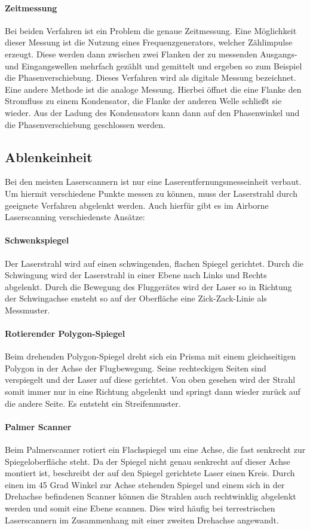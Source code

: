 \documentclass[a4paper,12pt,bibliography=totoc, listof=totoc,titlepage,pointlessnumbers]{scrreprt}
\begin{document}
\paragraph{Zeitmessung}
Bei beiden Verfahren ist ein Problem die genaue Zeitmessung. Eine Möglichkeit dieser Messung ist die Nutzung eines Frequenzgenerators, welcher Zählimpulse erzeugt. Diese werden dann zwischen zwei Flanken der zu messenden Ausgangs- und Eingangswellen mehrfach gezählt und gemittelt und ergeben so zum Beispiel die Phasenverschiebung. Dieses Verfahren wird als digitale Messung bezeichnet. Eine andere Methode ist die analoge Messung. Hierbei öffnet die eine Flanke den Stromfluss zu einem Kondensator, die Flanke der anderen Welle schließt sie wieder. Aus der Ladung des Kondensators kann dann auf den Phasenwinkel und die Phasenverschiebung geschlossen werden.  \citep[S. 314f]{Witte2006}

\subsection{Ablenkeinheit}
Bei den meisten Laserscannern ist nur eine Laserentfernungsmesseinheit verbaut. Um hiermit verschiedene Punkte messen zu können, muss der Laserstrahl durch geeignete Verfahren abgelenkt werden. Auch hierfür gibt es im Airborne Laserscanning verschiedenste Ansätze:

\paragraph{Schwenkspiegel}
Der Laserstrahl wird auf einen schwingenden, flachen Spiegel gerichtet. Durch die Schwingung wird der Laserstrahl in einer Ebene nach Links und Rechts abgelenkt. Durch die Bewegung des Fluggerätes wird der Laser so in Richtung der Schwingachse ensteht so auf der Oberfläche eine Zick-Zack-Linie als Messmuster.

\paragraph{Rotierender Polygon-Spiegel}
Beim drehenden Polygon-Spiegel dreht sich ein Prisma mit einem gleichseitigen Polygon in der Achse der Flugbewegung. Seine rechteckigen Seiten sind verspiegelt und der Laser auf diese gerichtet. Von oben gesehen wird der Strahl somit immer nur in eine Richtung abgelenkt und springt dann wieder zurück auf die andere Seite. Es entsteht ein Streifenmuster.

\paragraph{Palmer Scanner}
Beim Palmerscanner rotiert ein Flachspiegel um eine Achse, die fast senkrecht zur Spiegeloberfläche steht. Da der Spiegel nicht genau senkrecht auf dieser Achse montiert ist, beschreibt der auf den Spiegel gerichtete Laser einen Kreis. Durch einen im 45 Grad Winkel zur Achse stehenden Spiegel und einem sich in der Drehachse befindenen Scanner können die Strahlen auch rechtwinklig abgelenkt werden und somit eine Ebene scannen. Dies wird häufig bei terrestrischen Laserscannern im Zusammenhang mit einer zweiten Drehachse angewandt.
\end{document}

